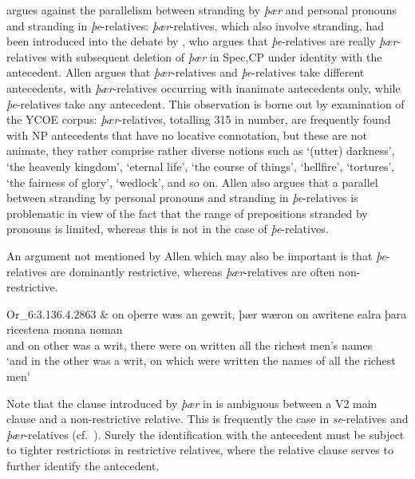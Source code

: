 \documentclass[output=paper]{langsci/langscibook}
\begin{document}
\citet{Allen1980} argues against the parallelism between stranding by
\textit{þær} and personal pronouns and stranding in \textit{þe}-relatives:
\textit{þær}-relatives, which also involve stranding, had been introduced into
the debate by \citet{Vat1978}, who argues that \textit{þe}-relatives are really
\textit{þær}-relatives with subsequent deletion of \textit{þær} in Spec,CP
under identity with the antecedent. Allen argues that \textit{þær}-relatives
and \textit{þe}-relatives take different antecedents, with
\textit{þær}-relatives occurring with inanimate antecedents only, while
\textit{þe}-relatives take any antecedent. This observation is borne out by
examination of the YCOE corpus: \textit{þær}-relatives, totalling 315 in
number, are frequently found with NP antecedents that have no locative
connotation, but these are not animate, they rather comprise rather
diverse notions such as \enquote*{(utter) darkness}, \enquote*{the heavenly
kingdom}, \enquote*{eternal life}, \enquote*{the course of things},
\enquote*{hellfire}, \enquote*{tortures}, \enquote*{the fairness of glory},
\enquote*{wedlock}, and so on. Allen also argues that a parallel between
stranding by personal pronouns and stranding in \textit{þe}-relatives is
problematic in view of the fact that the range of prepositions stranded by
pronouns is limited, whereas this is not in the case of
\textit{þe}-relatives.\newpage

An argument not mentioned by Allen which may also be important is that
\textit{þe}-relatives are dominantly restrictive, whereas
\textit{þær}-relatives are often non-re\-stric\-tive.

\ea Or\_6:3.136.4.2863%
    \label{ex:key:11.8}
    \sn
    \gll \& on oþerre wæs an gewrit, þær   wæron on awritene ealra þara ricestena monna noman\\
        and on other   was  a  writ,     there were    on written   all     the    richest men’s  names\\
    \glt ‘and in the other was a writ, on which were written the names of all the richest men’
\z

Note that the clause introduced by \textit{þær} in  is
ambiguous between a V2 main clause and a non-restrictive relative. This is
frequently the case in \textit{se}-relatives and \textit{þær}-relatives (cf.\
\citealt{LosvanKemenade2018}).  Surely the identification with the antecedent
must be subject to tighter restrictions in restrictive relatives, where the
relative clause serves to further identify the antecedent.
\end{document}
